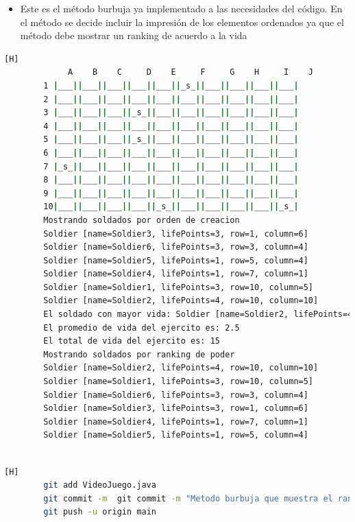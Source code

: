 \documentclass{article}
\begin{document}
	\begin{itemize}	
		\item Este es el método burbuja ya implementado a las necesidades del código. En el método se decide incluir la impresión de los elementos ordenados ya que el método debe mostrar un ranking de acuerdo a la vida
	\end{itemize}
	
	
	\begin{lstlisting}[language=bash,caption={ Compilando y probando todos los métodos solicitados en la práctica }][H]
		     A    B    C     D    E     F     G    H     I    J
		1 |___||___||___||___||___||_s_||___||___||___||___|
		2 |___||___||___||___||___||___||___||___||___||___|
		3 |___||___||___||_s_||___||___||___||___||___||___|
		4 |___||___||___||___||___||___||___||___||___||___|
		5 |___||___||___||_s_||___||___||___||___||___||___|
		6 |___||___||___||___||___||___||___||___||___||___|
		7 |_s_||___||___||___||___||___||___||___||___||___|
		8 |___||___||___||___||___||___||___||___||___||___|
		9 |___||___||___||___||___||___||___||___||___||___|
		10|___||___||___||___||_s_||___||___||___||___||_s_|
		Mostrando soldados por orden de creacion
		Soldier [name=Soldier3, lifePoints=3, row=1, column=6]
		Soldier [name=Soldier6, lifePoints=3, row=3, column=4]
		Soldier [name=Soldier5, lifePoints=1, row=5, column=4]
		Soldier [name=Soldier4, lifePoints=1, row=7, column=1]
		Soldier [name=Soldier1, lifePoints=3, row=10, column=5]
		Soldier [name=Soldier2, lifePoints=4, row=10, column=10]
		El soldado con mayor vida: Soldier [name=Soldier2, lifePoints=4, row=10, column=10]
		El promedio de vida del ejercito es: 2.5
		El total de vida del ejercito es: 15
		Mostrando soldados por ranking de poder
		Soldier [name=Soldier2, lifePoints=4, row=10, column=10]
		Soldier [name=Soldier1, lifePoints=3, row=10, column=5]
		Soldier [name=Soldier6, lifePoints=3, row=3, column=4]
		Soldier [name=Soldier3, lifePoints=3, row=1, column=6]
		Soldier [name=Soldier4, lifePoints=1, row=7, column=1]
		Soldier [name=Soldier5, lifePoints=1, row=5, column=4]
		
	\end{lstlisting}
	
	
	
	\begin{lstlisting}[language=bash,caption={ Commit: Metodo burbuja que muestra el ranking de poder }][H]
		git add VideoJuego.java
		git commit -m  git commit -m "Metodo burbuja que muestra el ranking de poder"
		git push -u origin main
	\end{lstlisting}
	
\end{document}
